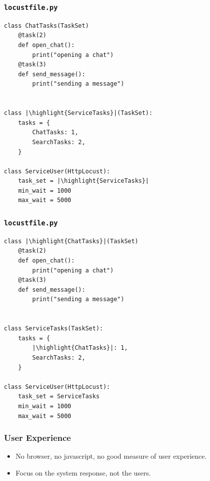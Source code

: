 \documentclass{beamer}
\begin{document}
\begin{frame}[fragile]
\frametitle{\texttt{locustfile.py}}
\begin{verbatim}
class ChatTasks(TaskSet)
    @task(2)
    def open_chat():
        print("opening a chat")
    @task(3)
    def send_message():
        print("sending a message")


class |\highlight{ServiceTasks}|(TaskSet):
    tasks = {
        ChatTasks: 1,
        SearchTasks: 2,
    }

class ServiceUser(HttpLocust):
    task_set = |\highlight{ServiceTasks}|
    min_wait = 1000
    max_wait = 5000
\end{verbatim}
\end{frame}


\begin{frame}[fragile]
\frametitle{\texttt{locustfile.py}}
\begin{verbatim}
class |\highlight{ChatTasks}|(TaskSet)
    @task(2)
    def open_chat():
        print("opening a chat")
    @task(3)
    def send_message():
        print("sending a message")


class ServiceTasks(TaskSet):
    tasks = {
        |\highlight{ChatTasks}|: 1,
        SearchTasks: 2,
    }

class ServiceUser(HttpLocust):
    task_set = ServiceTasks
    min_wait = 1000
    max_wait = 5000
\end{verbatim}
\end{frame}


\begin{frame}
\frametitle{User Experience}
\begin{itemize}
\item No browser, no javascript, no good measure of user experience.
\item Focus on the system response, not the users.
\end{itemize}
\end{frame}
\end{document}
